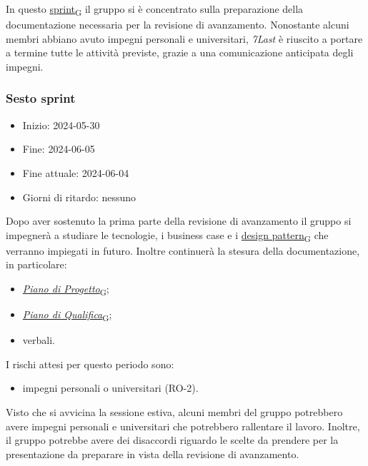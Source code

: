 In questo \href{https://7last.github.io/docs/pb/documentazione-interna/glossario\#sprint}{sprint\textsubscript{G}} il gruppo si è concentrato sulla preparazione della documentazione necessaria per la revisione
di avanzamento.
Nonostante alcuni membri abbiano avuto impegni personali e universitari, \textit{7Last} è riuscito a portare a termine
tutte le attività previste, grazie a una comunicazione anticipata degli impegni.\\



\newpage
\subsubsection{Sesto sprint}
\begin{itemize}
	\item Inizio: 2024-05-30
	\item Fine: 2024-06-05
	\item Fine attuale: 2024-06-04
	\item Giorni di ritardo: nessuno
\end{itemize}

Dopo aver sostenuto la prima parte della revisione di avanzamento il gruppo si impegnerà a studiare le tecnologie, i business case e i \href{https://7last.github.io/docs/pb/documentazione-interna/glossario\#design-pattern}{design pattern\textsubscript{G}} che verranno impiegati in futuro.
Inoltre continuerà la stesura della documentazione, in particolare:
\begin{itemize}
	\item \href{https://7last.github.io/docs/pb/documentazione-interna/glossario\#piano-di-progetto}{\textit{Piano di Progetto}\textsubscript{G}};
	\item \href{https://7last.github.io/docs/pb/documentazione-interna/glossario\#piano-di-qualifica}{\textit{Piano di Qualifica}\textsubscript{G}};
	\item verbali.
\end{itemize}

I rischi attesi per questo periodo sono:
\begin{itemize}
	\item impegni personali o universitari (RO-2).
\end{itemize}
Visto che si avvicina la sessione estiva, alcuni membri del gruppo potrebbero avere impegni personali e universitari che
potrebbero rallentare il lavoro.
Inoltre, il gruppo potrebbe avere dei disaccordi riguardo le scelte da prendere per la  presentazione da preparare in
vista della revisione di avanzamento.

